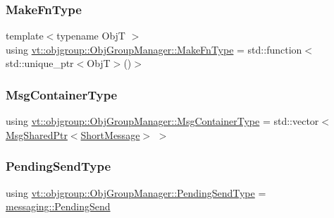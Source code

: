 \mbox{\label{structvt_1_1objgroup_1_1_obj_group_manager_a397d787b3876752a6d70511b2769b872}} 
\subsubsection{\texorpdfstring{Make\+Fn\+Type}{MakeFnType}}
{\footnotesize\ttfamily template$<$typename ObjT $>$ \\
using \hyperlink{structvt_1_1objgroup_1_1_obj_group_manager_a397d787b3876752a6d70511b2769b872}{vt\+::objgroup\+::\+Obj\+Group\+Manager\+::\+Make\+Fn\+Type} =  std\+::function$<$std\+::unique\+\_\+ptr$<$ObjT$>$()$>$}

\mbox{\label{structvt_1_1objgroup_1_1_obj_group_manager_ab89e17bd301b2aa684fce22f0b4af30a}} 
\subsubsection{\texorpdfstring{Msg\+Container\+Type}{MsgContainerType}}
{\footnotesize\ttfamily using \hyperlink{structvt_1_1objgroup_1_1_obj_group_manager_ab89e17bd301b2aa684fce22f0b4af30a}{vt\+::objgroup\+::\+Obj\+Group\+Manager\+::\+Msg\+Container\+Type} =  std\+::vector$<$\hyperlink{namespacevt_ab2b3d506ec8e8d1540aede826d84a239}{Msg\+Shared\+Ptr}$<$\hyperlink{namespacevt_a1125ac1da6c0bbf141e0ea0739d7602d}{Short\+Message}$>$ $>$}

\mbox{\label{structvt_1_1objgroup_1_1_obj_group_manager_a4f82f640edf670ba5a282074e5710921}} 
\subsubsection{\texorpdfstring{Pending\+Send\+Type}{PendingSendType}}
{\footnotesize\ttfamily using \hyperlink{structvt_1_1objgroup_1_1_obj_group_manager_a4f82f640edf670ba5a282074e5710921}{vt\+::objgroup\+::\+Obj\+Group\+Manager\+::\+Pending\+Send\+Type} =  \hyperlink{structvt_1_1messaging_1_1_pending_send}{messaging\+::\+Pending\+Send}}

